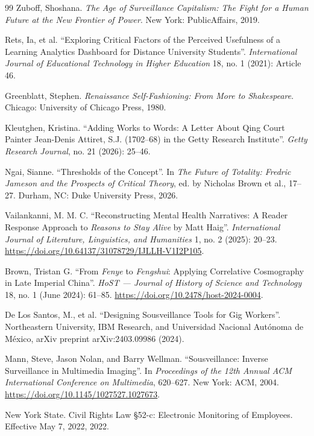 \documentclass[10pt]{article}
\begin{document}
\begin{thebibliography}{99}
 Zuboff, Shoshana. \emph{The Age of Surveillance Capitalism: The Fight for a Human Future at the New Frontier of Power}. New York: PublicAffairs, 2019.

 Rets, Ia, et al. ``Exploring Critical Factors of the Perceived Usefulness of a Learning Analytics Dashboard for Distance University Students''. \emph{International Journal of Educational Technology in Higher Education} 18, no. 1 (2021): Article 46.

 Greenblatt, Stephen. \emph{Renaissance Self-Fashioning: From More to Shakespeare}. Chicago: University of Chicago Press, 1980.

 Kleutghen, Kristina. ``Adding Works to Words: A Letter About Qing Court Painter Jean-Denis Attiret, S.J. (1702--68) in the Getty Research Institute''. \emph{Getty Research Journal}, no. 21 (2026): 25--46.

 Ngai, Sianne. ``Thresholds of the Concept''. In \emph{The Future of Totality: Fredric Jameson and the Prospects of Critical Theory}, ed. by Nicholas Brown et al., 17--27. Durham, NC: Duke University Press, 2026.

 Vailankanni, M. M. C. ``Reconstructing Mental Health Narratives: A Reader Response Approach to \emph{Reasons to Stay Alive} by Matt Haig''. \emph{International Journal of Literature, Linguistics, and Humanities} 1, no. 2 (2025): 20--23. \url{https://doi.org/10.64137/31078729/IJLLH-V1I2P105}.

 Brown, Tristan G. ``From \emph{Fenye} to \emph{Fengshui}: Applying Correlative Cosmography in Late Imperial China''. \emph{HoST --- Journal of History of Science and Technology} 18, no. 1 (June 2024): 61--85. \url{https://doi.org/10.2478/host-2024-0004}.

 De Los Santos, M., et al. ``Designing Sousveillance Tools for Gig Workers''. Northeastern University, IBM Research, and Universidad Nacional Aut\'onoma de M\'exico, arXiv preprint arXiv:2403.09986 (2024).

 Mann, Steve, Jason Nolan, and Barry Wellman. ``Sousveillance: Inverse Surveillance in Multimedia Imaging''. In \emph{Proceedings of the 12th Annual ACM International Conference on Multimedia}, 620--627. New York: ACM, 2004. \url{https://doi.org/10.1145/1027527.1027673}.

 New York State. Civil Rights Law \S 52-c: Electronic Monitoring of Employees. Effective May 7, 2022, 2022.


\end{thebibliography}
\end{document}
